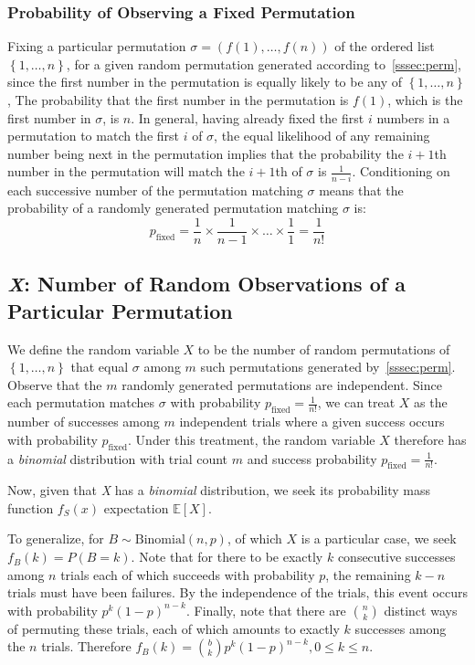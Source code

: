 \documentclass[11pt, oneside]{article}   	%
\begin{document}
\subsubsection{Probability of Observing a Fixed Permutation}
Fixing a particular permutation $\sigma = (f(1), \dots, f(n))$ of the ordered list $\left\{1, \dots, n\right\}$, for a given random permutation generated according to~\ref{sssec:perm}, since the first number in the permutation is equally likely to be any of $\left\{1, \dots, n\right\}$, The probability that the first number in the permutation is $f(1)$, which is the first number in $\sigma$, is $n$. In general, having already fixed the first $i$ numbers in a permutation to match the first $i$ of $\sigma$, the equal likelihood of any remaining number being next in the permutation implies that the probability the $i + 1$th number in the permutation will match the $i + 1$th of $\sigma$ is $\frac{1}{n - i}$. Conditioning on each successive number of the permutation matching $\sigma$ means that the probability of a randomly generated permutation matching $\sigma$ is:
\begin{equation}\label{eqn:fix}
  p_{\text{fixed}} = \frac{1}{n} \times \frac{1}{n - 1} \times \dots \times \frac{1}{1} = \frac{1}{n!}
\end{equation}

\subsection{\textit{X}: Number of Random Observations of a Particular Permutation}\label{ssec:x}
We define the random variable $X$ to be the number of random permutations of $\left\{1, \dots, n\right\}$ that equal $\sigma$ among $m$ such permutations generated by~\ref{sssec:perm}. Observe that the $m$ randomly generated permutations are independent. Since each permutation matches $\sigma$ with probability $p_{\text{fixed}} = \frac{1}{n!}$, we can treat $X$ as the number of successes among $m$ independent trials where a given success occurs with probability $p_{\text{fixed}}$. Under this treatment, the random variable $X$ therefore has a \textit{binomial} distribution with trial count $m$ and success probability $p_{\text{fixed}} = \frac{1}{n!}$.

Now, given that \textit{X} has a \textit{binomial} distribution, we seek its probability mass function $f_S(x)$ expectation $\mathbb{E}[X]$.

To generalize, for $B \sim \text{Binomial}(n, p)$, of which $X$ is a particular case, we seek $f_B(k) = P(B = k)$. Note that for there to be exactly $k$ consecutive successes among $n$ trials each of which succeeds with probability $p$, the remaining $k - n$ trials must have been failures. By the independence of the trials, this event occurs with probability $p^k(1-p)^{n-k}$. Finally, note that there are ${n \choose k}$ distinct ways of permuting these trials, each of which amounts to exactly $k$ successes among the $n$ trials. Therefore $f_B(k) = {b \choose k}p^k(1-p)^{n-k}, 0 \leq k \leq n$.
\end{document}
